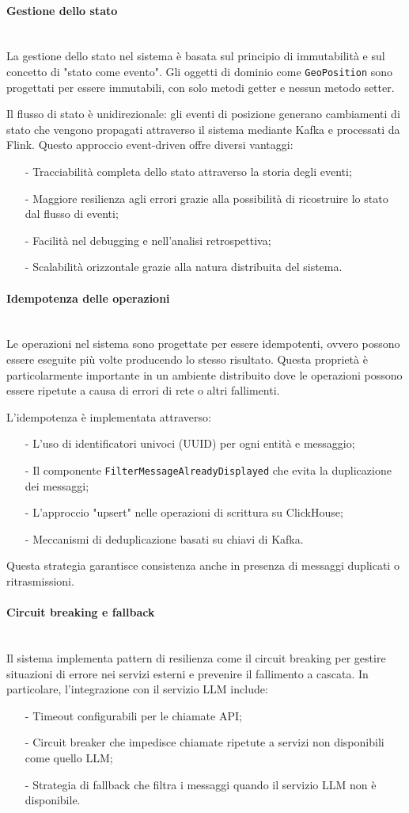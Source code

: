 \documentclass[10pt]{article}
\newcommand{\myparagraph}[1]{\paragraph{#1}\mbox{}\\}
\begin{document}
    \myparagraph{Gestione dello stato}
    La gestione dello stato nel sistema è basata sul principio di immutabilità e sul concetto di "stato come evento". Gli oggetti di dominio come \texttt{GeoPosition} sono progettati per essere immutabili, con solo metodi getter e nessun metodo setter.

    Il flusso di stato è unidirezionale: gli eventi di posizione generano cambiamenti di stato che vengono propagati attraverso il sistema mediante Kafka e processati da Flink. Questo approccio event-driven offre diversi vantaggi:
    \begin{itemize}
        \item[-] Tracciabilità completa dello stato attraverso la storia degli eventi;
        \item[-] Maggiore resilienza agli errori grazie alla possibilità di ricostruire lo stato dal flusso di eventi;
        \item[-] Facilità nel debugging e nell'analisi retrospettiva;
        \item[-] Scalabilità orizzontale grazie alla natura distribuita del sistema.
    \end{itemize}

    \myparagraph{Idempotenza delle operazioni}
    Le operazioni nel sistema sono progettate per essere idempotenti, ovvero possono essere eseguite più volte producendo lo stesso risultato. Questa proprietà è particolarmente importante in un ambiente distribuito dove le operazioni possono essere ripetute a causa di errori di rete o altri fallimenti.

    L'idempotenza è implementata attraverso:
    \begin{itemize}
        \item[-] L'uso di identificatori univoci (UUID) per ogni entità e messaggio;
        \item[-] Il componente \texttt{FilterMessageAlreadyDisplayed} che evita la duplicazione dei messaggi;
        \item[-] L'approccio "upsert" nelle operazioni di scrittura su ClickHouse;
        \item[-] Meccanismi di deduplicazione basati su chiavi di Kafka.
    \end{itemize}

    Questa strategia garantisce consistenza anche in presenza di messaggi duplicati o ritrasmissioni.

    \myparagraph{Circuit breaking e fallback}
    Il sistema implementa pattern di resilienza come il circuit breaking per gestire situazioni di errore nei servizi esterni e prevenire il fallimento a cascata. In particolare, l'integrazione con il servizio LLM include:
    \begin{itemize}
        \item[-] Timeout configurabili per le chiamate API;
        \item[-] Circuit breaker che impedisce chiamate ripetute a servizi non disponibili come quello LLM;
        \item[-] Strategia di fallback che filtra i messaggi quando il servizio LLM non è disponibile.
    \end{itemize}
\end{document}
